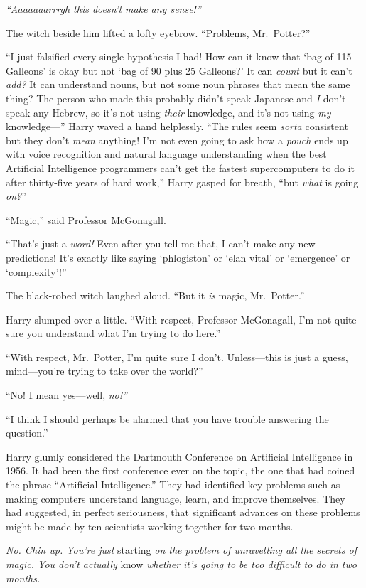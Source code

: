 \emph{``Aaaaaaarrrgh this doesn't make any sense!''}

The witch beside him lifted a lofty eyebrow. ``Problems, Mr.~Potter?''

``I just falsified every single hypothesis I had! How can it know that
`bag of 115 Galleons' is okay but not `bag of 90 plus 25 Galleons?' It
can \emph{count} but it can't \emph{add?} It can understand nouns, but
not some noun phrases that mean the same thing? The person who made this
probably didn't speak Japanese and \emph{I} don't speak any Hebrew, so
it's not using \emph{their} knowledge, and it's not using \emph{my}
knowledge---'' Harry waved a hand helplessly. ``The rules seem
\emph{sorta} consistent but they don't \emph{mean} anything! I'm not
even going to ask how a \emph{pouch} ends up with voice recognition and
natural language understanding when the best Artificial Intelligence
programmers can't get the fastest supercomputers to do it after
thirty-five years of hard work,'' Harry gasped for breath, ``but
\emph{what} is going \emph{on?}''

``Magic,'' said Professor McGonagall.

``That's just a \emph{word!} Even after you tell me that, I can't make
any new predictions! It's exactly like saying `phlogiston' or `elan
vital' or `emergence' or `complexity'!''

The black-robed witch laughed aloud. ``But it \emph{is} magic,
Mr.~Potter.''

Harry slumped over a little. ``With respect, Professor McGonagall, I'm
not quite sure you understand what I'm trying to do here.''

``With respect, Mr.~Potter, I'm quite sure I don't. Unless---this is
just a guess, mind---you're trying to take over the world?''

``No! I mean yes---well, \emph{no!''}

``I think I should perhaps be alarmed that you have trouble answering
the question.''

Harry glumly considered the Dartmouth Conference on Artificial
Intelligence in 1956. It had been the first conference ever on the
topic, the one that had coined the phrase ``Artificial Intelligence.''
They had identified key problems such as making computers understand
language, learn, and improve themselves. They had suggested, in perfect
seriousness, that significant advances on these problems might be made
by ten scientists working together for two months.

\emph{No. Chin up. You're just} starting \emph{on the problem of
unravelling all the secrets of magic. You don't actually} know
\emph{whether it's going to be too difficult to do in two months.}

